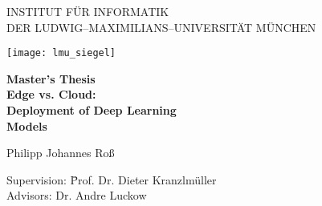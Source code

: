 \begin{center}

\vspace*{-2cm}

{\Huge INSTITUT FÜR INFORMATIK\\[1mm]}
DER LUDWIG--MAXIMILIANS--UNIVERSITÄT MÜNCHEN\\

\vspace*{1cm}

\texttt{[image: lmu\_siegel]}

\vspace*{2cm}

{\Large \textbf{Master's Thesis}}\\ %

\vspace{2.0cm}
{\Huge \textbf{Edge vs. Cloud:}}\\
\vspace*{2.5mm}
{\Huge \textbf{Deployment of Deep Learning}}\\
\vspace*{2mm}
{\Huge \textbf{Models}}\\
 
\vspace{1.0cm}

{\LARGE Philipp Johannes Roß} %
\vspace{2cm}

\parbox{1cm}{
\begin{large}
\begin{tabbing}
Supervision: \hspace{.5cm} \=Prof. Dr. Dieter Kranzlmüller\\[2mm]
Advisors:
\>Dr. Andre Luckow\\[5mm]
\end{tabbing}
\end{large}}\\
\vspace{5mm}

\end{center}
